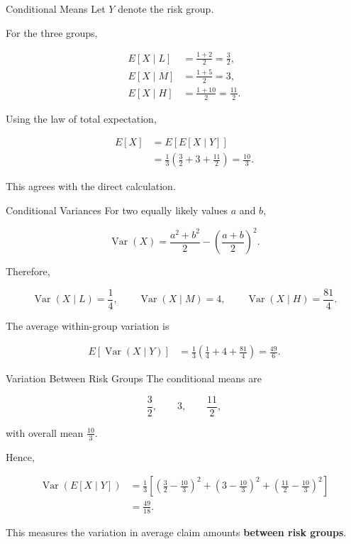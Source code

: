 \documentclass[
  ignorenonframetext,
  aspectratio=169,
]{beamer}
\begin{document}
\begin{frame}{Conditional Means}
\protect{}\label{conditional-means}
Let \(Y\) denote the risk group.

For the three groups,

\[
\begin{aligned}
E[X\mid L]&=\frac{1+2}{2}=\frac32,\\
E[X\mid M]&=\frac{1+5}{2}=3,\\
E[X\mid H]&=\frac{1+10}{2}=\frac{11}{2}.
\end{aligned}
\]

Using the law of total expectation,

\[
\begin{aligned}
E[X]
&=E[E[X\mid Y]]\\
&=\frac13\left(
\frac32+3+\frac{11}{2}
\right)=\frac{10}{3}.
\end{aligned}
\]

This agrees with the direct calculation.
\end{frame}

\begin{frame}{Conditional Variances}
\protect{}\label{conditional-variances}
For two equally likely values \(a\) and \(b\),

\[
\operatorname{Var}(X)
=
\frac{a^2+b^2}{2}
-\left(\frac{a+b}{2}\right)^2.
\]

Therefore,

\[
\operatorname{Var}(X\mid L)=\frac14,\qquad \operatorname{Var}(X\mid M)=4,\qquad \operatorname{Var}(X\mid H)=\frac{81}{4}.
\]

The average within-group variation is

\[
\begin{aligned}
E[\operatorname{Var}(X\mid Y)]
&=\frac13\left(
\frac14+4+\frac{81}{4}
\right) = \frac{49}{6}.
\end{aligned}
\]
\end{frame}

\begin{frame}{Variation Between Risk Groups}
\protect{}\label{variation-between-risk-groups}
The conditional means are

\[
\frac32,\qquad 3,\qquad \frac{11}{2},
\]

with overall mean \(\frac{10}{3}\).

Hence,

\[
\begin{aligned}
\operatorname{Var}(E[X\mid Y])
&=\frac13\left[
\left(\frac32-\frac{10}{3}\right)^2
+\left(3-\frac{10}{3}\right)^2
+\left(\frac{11}{2}-\frac{10}{3}\right)^2
\right]\\
&=\frac{49}{18}.
\end{aligned}
\]

This measures the variation in average claim amounts \textbf{between
risk groups}.
\end{frame}
\end{document}
